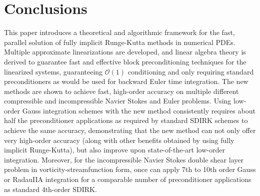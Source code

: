 \documentclass[review]{siamart}
\begin{document}
\section{Conclusions}\label{sec:conc}

This paper introduces a theoretical and algorithmic framework for the fast, parallel
solution of fully implicit Runge-Kutta methods in numerical PDEs. Multiple approximate
linearizations are developed, and linear algebra theory is derived to guarantee
fast and effective block preconditioning techniques for the linearized systems,
guaranteeing $\mathcal{O}(1)$ conditioning and only requiring standard preconditioners
as would be used for backward Euler time integration. The new methods are shown to achieve fast,
high-order accuracy on multiple different compressible and incompressible Navier
Stokes and Euler problems. Using low-order Gauss integration schemes
with the new method consistently requires about half the preconditioner applications as
required by standard SDIRK schemes to achieve the same accuracy, demonstrating that
the new method can not only offer very high-order accuracy (along with other benefits
obtained by using fully implicit Runge-Kutta), but also improve upon state-of-the-art
low-order integration. Moreover, for the incompressible Navier Stokes double shear
layer problem in vorticity-streamfunction form, once can apply 7th to 10th order Gauss
or RadauIIA integration for a comparable number of preconditioner applications as
standard 4th-order SDIRK. 


\end{document}
